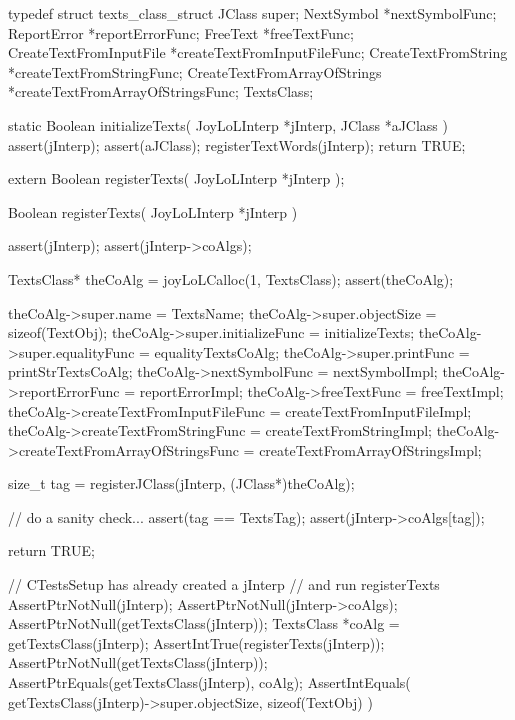 \startTestSuite[registerTexts]

\startCHeader
typedef struct texts_class_struct {
  JClass                    super;
  NextSymbol                   *nextSymbolFunc;
  ReportError                  *reportErrorFunc;
  FreeText                     *freeTextFunc;
  CreateTextFromInputFile      *createTextFromInputFileFunc;
  CreateTextFromString         *createTextFromStringFunc;
  CreateTextFromArrayOfStrings *createTextFromArrayOfStringsFunc;
} TextsClass;
\stopCHeader

\startCCode
static Boolean initializeTexts(
  JoyLoLInterp *jInterp,
  JClass   *aJClass
) {
  assert(jInterp);
  assert(aJClass);
  registerTextWords(jInterp);
  return TRUE;
}
\stopCCode

\startCHeader
extern Boolean registerTexts(
  JoyLoLInterp *jInterp
);
\stopCHeader
{}

\startCCode
Boolean registerTexts(
  JoyLoLInterp *jInterp
) {
  assert(jInterp);
  assert(jInterp->coAlgs);
  
  TextsClass* theCoAlg = joyLoLCalloc(1, TextsClass);
  assert(theCoAlg);
  
  theCoAlg->super.name           = TextsName;
  theCoAlg->super.objectSize     = sizeof(TextObj);
  theCoAlg->super.initializeFunc = initializeTexts;
  theCoAlg->super.equalityFunc   = equalityTextsCoAlg;
  theCoAlg->super.printFunc      = printStrTextsCoAlg;
  theCoAlg->nextSymbolFunc       = nextSymbolImpl;
  theCoAlg->reportErrorFunc      = reportErrorImpl;
  theCoAlg->freeTextFunc         = freeTextImpl;
  theCoAlg->createTextFromInputFileFunc = 
    createTextFromInputFileImpl;
  theCoAlg->createTextFromStringFunc =
    createTextFromStringImpl;
  theCoAlg->createTextFromArrayOfStringsFunc =
    createTextFromArrayOfStringsImpl;

  size_t tag =
    registerJClass(jInterp, (JClass*)theCoAlg);
  
  // do a sanity check...
  assert(tag == TextsTag);
  assert(jInterp->coAlgs[tag]);

  return TRUE;
}
\stopCCode


\startCTest
  // CTestsSetup has already created a jInterp
  // and run registerTexts
  AssertPtrNotNull(jInterp);
  AssertPtrNotNull(jInterp->coAlgs);
  AssertPtrNotNull(getTextsClass(jInterp));
  TextsClass *coAlg = getTextsClass(jInterp);
  AssertIntTrue(registerTexts(jInterp));
  AssertPtrNotNull(getTextsClass(jInterp));
  AssertPtrEquals(getTextsClass(jInterp), coAlg);
  AssertIntEquals(
    getTextsClass(jInterp)->super.objectSize,
    sizeof(TextObj)
  )
\stopCTest
\stopTestCase
\stopTestSuite
